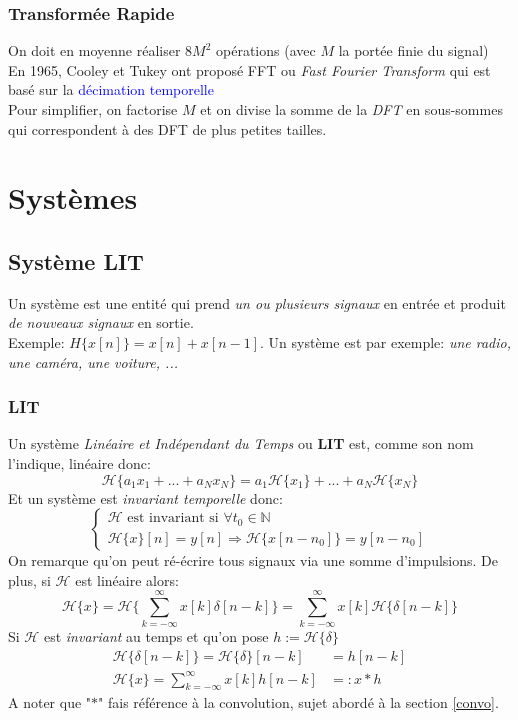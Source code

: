 \documentclass{report}
\begin{document}
\section{Transformée Rapide}
On doit en moyenne réaliser $8M^2$ opérations (avec $M$ la portée finie du signal)\\
En 1965, Cooley et Tukey ont proposé FFT ou \textit{Fast Fourier Transform} qui est basé sur la \textcolor{blue}{décimation temporelle}\\
Pour simplifier, on factorise $M$ et on divise la somme de la \textit{DFT} en sous-sommes qui correspondent à des DFT de plus petites tailles.


\part{Systèmes}

\chapter{Système LIT}
Un système est une entité qui prend \textit{un ou plusieurs signaux} en entrée et produit \textit{de nouveaux signaux} en sortie.\\
Exemple: $H\{x[n]\} = x[n] + x[n-1]$. Un système est par exemple: \textit{une radio, une caméra, une voiture, ...}

\section{LIT}
Un système \textit{Linéaire et Indépendant du Temps} ou \textbf{LIT} est, comme son nom l'indique, linéaire donc:
\begin{equation}
\mathcal{H}\{a_1x_1 + ... + a_Nx_N\} = a_1\mathcal{H}\{x_1\} + ... + a_N\mathcal{H}\{x_N\} 
\end{equation}
Et un système est \textit{invariant temporelle} donc:
\begin{equation}
\begin{cases}
\mathcal{H} \text{ est invariant si } \forall t_0 \in \mathbb{N}\\
\mathcal{H}\{x\}[n] = y[n] \Rightarrow \mathcal{H}\{x[n-n_0]\} = y[n-n_0]
\end{cases}
\end{equation}
On remarque qu'on peut ré-écrire tous signaux via une somme d'impulsions. De plus, si $\mathcal{H}$ est linéaire alors:
\begin{equation}
\mathcal{H}\{x\} = \mathcal{H}\biggl\{\sum_{k= -\infty}^{\infty} x[k]\delta[n-k] \biggl\} = \sum_{k=-\infty}^{\infty} x[k]\mathcal{H}\{\delta[n-k]\}
\end{equation}
Si $\mathcal{H}$ est \textit{invariant} au temps et qu'on pose $h := \mathcal{H}\{\delta\}$
\begin{align*}
\mathcal{H}\{\delta[n-k]\} = \mathcal{H}\{\delta\}[n-k] &= h[n-k]\\
\mathcal{H}\{x\} = \sum_{k=-\infty}^{\infty} x[k]h[n-k] &=: x \ast h
\end{align*}
A noter que "$\ast$" fais référence à la convolution, sujet abordé à la section \ref{convo}.\\
\end{document}
